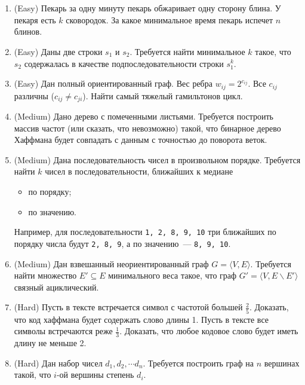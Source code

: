 \section{}

\begin{enumerate}

  \item (Easy) Пекарь за одну минуту пекарь обжаривает
  одну сторону блина. У пекаря есть $k$ сковородок. За какое минимальное
  время пекарь испечет $n$ блинов.	

  \item (Easy) Даны две строки $s_1$ и $s_2$. Требуется найти минимальное
  $k$ такое, что $s_2$ содержалась в качестве подпоследовательности строки
  $s_1^k$.

  \item (Easy) Дан полный ориентированный граф. Вес ребра $w_{ij} = 2^{c_{ij}}$.
  Все $c_{ij}$ различны ($c_{ij} \neq c_{ji}$). Найти самый тяжелый гамильтонов
  цикл.

  \item (Medium) Дано дерево с помеченными листьями. Требуется построить массив
  частот (или сказать, что невозможно) такой, что бинарное дерево Хаффмана будет
  совпадать с данным с точностью до поворота веток.

  \item (Medium) Дана последовательность чисел в произвольном порядке. Требуется
  найти $k$ чисел в последовательности, ближайших к медиане
    \begin{itemize}
      \item по порядку;
      \item по значению.
    \end{itemize}
  Например, для последовательности \texttt{1, 2, 8, 9, 10} три ближайших по порядку
  числа будут \texttt{2, 8, 9}, а по значению~--- \texttt{8, 9, 10}.
   
  \item (Medium) Дан взвешанный неориентированный граф $G = \langle V, E \rangle$. 
  Требуется найти множество $E' \subseteq E$ минимального веса такое, что граф
  $G' = \langle V, E \backslash E' \rangle$ связный ациклический.

  \item (Hard) Пусть в тексте встречается символ с частотой большей $\frac{2}{5}$.
  Доказать, что код хаффмана будет содержать слово длины 1. Пусть в тексте
  все символы встречаются реже $\frac{1}{3}$. Доказать, что любое кодовое
  слово будет иметь длину не меньше 2.
  
  \item (Hard) Дан набор чисел $d_1, d_2, \cdots d_n$. Требуется построить 
  граф на $n$ вершинах такой, что $i$-ой вершины степень $d_i$.

\end{enumerate}
